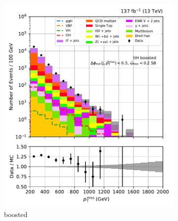 \begin{figure}[htbp]
    \centering
    \begin{subfigure}[b]{0.24\textwidth}
        \includegraphics[width=\textwidth]{figures/region_plots/full_Run2/sideband_0/ttH_boosted.pdf}
        \caption{\ttH boosted}
    \end{subfigure}
    \hfill
    \begin{subfigure}[b]{0.24\textwidth}

\end{subfigure}
\end{figure}
